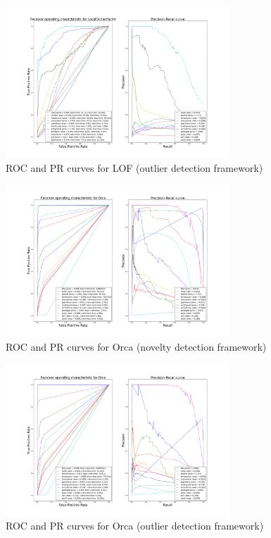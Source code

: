 \begin{figure}[!ht]
    \caption{\acs{ROC} and \acs{PR} curves for \acs{LOF} (outlier detection
    framework)}
    \label{ocrf:fig:lof_roc_pr_unsupervised}
    \centering
    \includegraphics[trim=175 80 175 123, clip,
    width=0.75\textwidth]{./gfx/bench_lof_roc_pr_unsupervised_factorized.png}
\end{figure}
\begin{figure}[!ht]
    \caption{\acs{ROC} and \acs{PR} curves for Orca (novelty detection
    framework)}
    \label{ocrf:fig:orca_roc_pr}
    \centering
    \includegraphics[trim=175 80 175 123, clip,
    width=0.75\textwidth]{./gfx/bench_orca_roc_pr_supervised_factorized.png}
\end{figure}
\begin{figure}[!ht]
    \caption{\acs{ROC} and \acs{PR} curves for Orca (outlier detection
    framework)}
    \label{ocrf:fig:orca_roc_pr_unsupervised}
    \centering
    \includegraphics[trim=175 80 175 123, clip,
    width=0.75\textwidth]{./gfx/bench_orca_roc_pr_unsupervised_factorized.png}
\end{figure}
